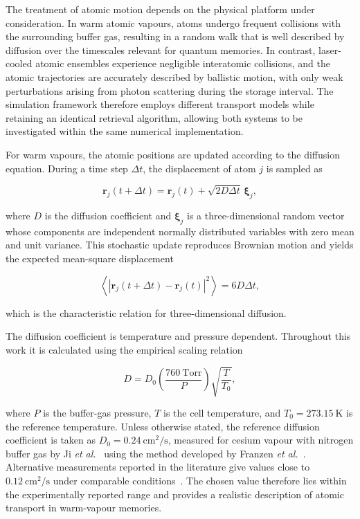 The treatment of atomic motion depends on the physical platform under consideration. In warm atomic vapours, atoms undergo frequent collisions with the surrounding buffer gas, resulting in a random walk that is well described by diffusion over the timescales relevant for quantum memories. In contrast, laser-cooled atomic ensembles experience negligible interatomic collisions, and the atomic trajectories are accurately described by ballistic motion, with only weak perturbations arising from photon scattering during the storage interval. The simulation framework therefore employs different transport models while retaining an identical retrieval algorithm, allowing both systems to be investigated within the same numerical implementation.

For warm vapours, the atomic positions are updated according to the diffusion equation. During a time step $\Delta t$, the displacement of atom $j$ is sampled as~\cite{MonteCarloNotes}

\begin{equation}
    \mathbf{r}_j(t+\Delta t)
    =
    \mathbf{r}_j(t)
    +
    \sqrt{2D\Delta t}\,
    \boldsymbol{\xi}_j,
    \label{eq:diffusive_position_update}
\end{equation}

where $D$ is the diffusion coefficient and $\boldsymbol{\xi}_j$ is a three-dimensional random vector whose components are independent normally distributed variables with zero mean and unit variance. This stochastic update reproduces Brownian motion and yields the expected mean-square displacement

\begin{equation}
    \left\langle
    \left|
    \mathbf{r}_j(t+\Delta t)-\mathbf{r}_j(t)
    \right|^2
    \right\rangle
    =
    6D\Delta t,
    \label{eq:diffusion_msd}
\end{equation}

which is the characteristic relation for three-dimensional diffusion.

The diffusion coefficient is temperature and pressure dependent. Throughout this work it is calculated using the empirical scaling relation~\cite{DiffusionScaling2013}

\begin{equation}
    D
    =
    D_0
    \left(\frac{760~\mathrm{Torr}}{P}\right)
    \sqrt{\frac{T}{T_0}},
    \label{eq:diffusion_coefficient}
\end{equation}

where $P$ is the buffer-gas pressure, $T$ is the cell temperature, and $T_0=\SI{273.15}{\kelvin}$ is the reference temperature. Unless otherwise stated, the reference diffusion coefficient is taken as $D_0=\SI{0.24}{\centi\metre\squared\per\second}$, measured for cesium vapour with nitrogen buffer gas by Ji \emph{et al.}~\cite{Ji2017} using the method developed by Franzen \emph{et al.}~\cite{Franzen2013}. Alternative measurements reported in the literature give values close to $\SI{0.12}{\centi\metre\squared\per\second}$ under comparable conditions~\cite{AlternativeDiffusionMeasurement}. The chosen value therefore lies within the experimentally reported range and provides a realistic description of atomic transport in warm-vapour memories.

